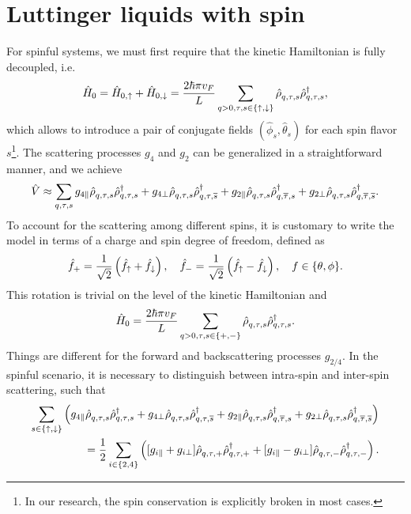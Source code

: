 \section{Luttinger liquids with spin}
\label{sec:LL_with_spin}
For spinful systems, we must first require that the kinetic Hamiltonian is fully decoupled, i.e.
\begin{align}
    \hat H_0 = \hat H_{0,\uparrow}+\hat H_{0,\downarrow}
    = \frac{2\hbar\pi v_F}L\sum_{q>0,\tau,s\in\{\uparrow,\downarrow\}}\hat\rho^\pdag_{q,\tau,s}\hat\rho^\dag_{q,\tau,s},
\end{align}
which allows to introduce a pair of conjugate fields $(\hat \phi_s,\hat \theta_s)$ for each spin flavor $s$\footnote{In our research, the spin conservation is explicitly broken in most cases.}.
The scattering processes $g_4$ and $g_2$ can be generalized in a straightforward manner, and we achieve
\begin{align}
  \hat V \approx
  \sum_{q,\tau,s}
  g_{4\parallel}\hat\rho^\pdag_{q,\tau,s}\hat\rho^\dag_{q,\tau,s}
  +
  g_{4\perp}\hat\rho^\pdag_{q,\tau,s}\hat\rho^\dag_{q,\tau,\overline s}
  +
  g_{2\parallel}\hat\rho^\pdag_{q,\tau,s}\hat\rho^\dag_{q,\overline\tau,s}
  +
  g_{2\perp}\hat\rho^\pdag_{q,\tau,s}\hat\rho^\dag_{q,\overline\tau,\overline s}.
\end{align}
To account for the scattering among different spins, it is customary to write the model in terms of a charge and spin degree of freedom, defined as
\begin{align}
    \hat f_+=\frac1{\sqrt2}\left( \hat f_\uparrow + \hat f_\downarrow \right),
    \quad
    \hat f_-=\frac1{\sqrt2}\left( \hat f_\uparrow - \hat f_\downarrow \right),
    \quad
    f\in\{\theta,\phi\}.
\end{align}
This rotation is trivial on the level of the kinetic Hamiltonian and
\begin{align}
    \hat H_0 = \frac{2\hbar\pi v_F}L\sum_{q>0,\tau,s\in\{+,-\}}\hat\rho^\pdag_{q,\tau,s}\hat\rho^\dag_{q,\tau,s}.
\end{align}
Things are different for the forward and backscattering processes $g_{2/4}$.
In the spinful scenario, it is necessary to distinguish between intra-spin and inter-spin scattering, such that
\begin{align}
  \sum_{s\in\{\uparrow,\downarrow\}}
  \brlr{
  g_{4\parallel}\hat\rho^\pdag_{q,\tau,s}\hat\rho^\dag_{q,\tau,s}
  +
  g_{4\perp}\hat\rho^\pdag_{q,\tau,s}\hat\rho^\dag_{q,\tau,\overline s}
  +
  g_{2\parallel}\hat\rho^\pdag_{q,\tau,s}\hat\rho^\dag_{q,\overline\tau,s}
  +
  g_{2\perp}\hat\rho^\pdag_{q,\tau,s}\hat\rho^\dag_{q,\overline\tau,\overline s}
  }
  \\
  =
  \frac12
  \sum_{i\in\{2,4\}}
  \brlr{
  [g_{i\parallel}+g_{i\perp}]\hat\rho^\pdag_{q,\tau,+}\hat\rho^\dag_{q,\tau,+}
  +
  [g_{i\parallel}-g_{i\perp}]\hat\rho^\pdag_{q,\tau,-}\hat\rho^\dag_{q,\tau,-}
  }.
\end{align}
